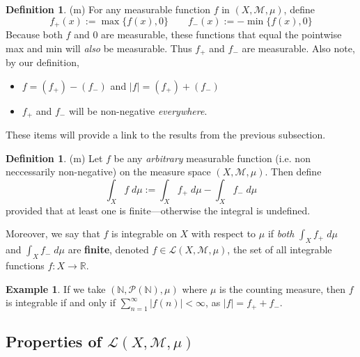 \documentclass[12pt]{article}
\theoremstyle{plain}
\theoremstyle{definition}
\newtheorem{defn}[thm]{Definition}
\newtheorem{ex}[thm]{Example}
\theoremstyle{remark}
\begin{document}
\begin{defn} (m)
For any measurable function $f$ in $(X,\mathscr{M},\mu)$, define
\[
    f_+(x) := \max\{f(x), 0\}
    \qquad
    f_-(x) := -\min\{f(x), 0\}
\]
Because both $f$ and $0$ are measurable, these functions that equal the pointwise max and min will \emph{also} be measurable. Thus $f_+$ and $f_-$ are measurable. Also note, by our definition, 
\begin{itemize}
    \item $f = (f_+) - (f_-)$ and $|f| = (f_+) + (f_-)$
    \item $f_+$ and $f_-$ will be non-negative \emph{everywhere}.  
\end{itemize}
These items will provide a link to the results from the previous subsection.
\end{defn}

\begin{defn} (m)
Let $f$ be any \emph{arbitrary} measurable function (i.e. non neccessarily non-negative) on the measure space $(X,\mathscr{M},\mu)$. Then define 
\[
    \int_X f\; d\mu := \int_X f_+ \; d\mu - \int_X f_- \; d\mu
\]
provided that at least one is finite---otherwise the integral is undefined.

Moreover, we say that $f$ is integrable on $X$ with respect to $\mu$ if \emph{both} $\int_X f_+ \; d\mu$ and $\int_X f_- \; d\mu$ are \textbf{finite}, denoted $f\in\mathscr{L}(X,\mathscr{M},\mu)$, the set of all integrable functions $f:X\rightarrow\mathbb{R}$.
\end{defn}

\begin{ex}
    If we take $(\mathbb{N}, \mathscr{P}(\mathbb{N}), \mu)$ where $\mu$ is the counting measure, then $f$ is integrable if and only if $\sum^\infty_{n=1}|f(n)|<\infty$, as $|f| = f_+ + f_-$.
\end{ex}

\newpage
\subsection{Properties of $\mathscr{L}(X,\mathscr{M},\mu)$}
\end{document}
